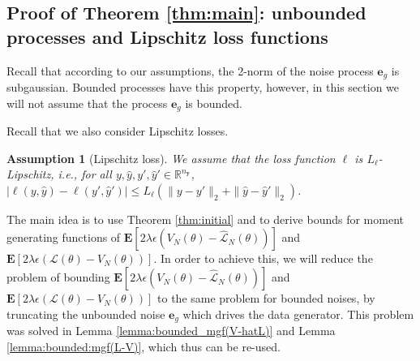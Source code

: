 \documentclass{article}
\def\rvy{{\mathbf{y}}}
\newtheorem{assumption}[theorem]{Assumption}
\newcommand{\e}{\mathbf{e}}
\newcommand{\bE}{\mathbf{E}}
\begin{document}
\subsection{Proof of Theorem \ref{thm:main}: unbounded processes and Lipschitz loss functions}
\label{lipschitz:unbounded}

 
Recall that according to our assumptions, the 2-norm of the noise process $\e_g$ is subgaussian. 
Bounded processes have this property, however, in this section we will not
assume that the process $\e_g$ is bounded. 

Recall that we also consider Lipschitz losses.
\begin{assumption}[Lipschitz loss]
  \label{as:unbounded_lipschitz}
We assume that the loss function $\ell$ is $L_{\ell}$-Lipschitz, i.e., 
for all $y,\hat{y},y',\hat{y}' \in \mathbb{R}^{n_\rvy}$,
$|\ell(y,\hat{y})-\ell(y',\hat{y}')| \le L_{\ell} (\|y-y'\|_2+\|\hat{y}-\hat{y}'\|_2)$.
\end{assumption}


The main idea is to use Theorem \ref{thm:initial} and to derive bounds for 
moment generating functions of 
$\bE[ 2\lambda \epsilon (V_N(\theta)-\hat{\mathcal{L}}_N(\theta))]$ and $\bE[2\lambda \epsilon (\mathcal{L}(\theta)-V_N(\theta))]$. 
In order to achieve this, we will reduce the problem of bounding 
$\bE[ 2\lambda \epsilon (V_N(\theta)-\hat{\mathcal{L}}_N(\theta))]$ and $\bE[2\lambda \epsilon (\mathcal{L}(\theta)-V_N(\theta))]$
to the same problem for bounded noises, %
by truncating the unbounded noise
$\e_g$  which drives the data generator. %
This problem was solved in Lemma \ref{lemma:bounded_mgf(V-hatL)} and Lemma \ref{lemma:bounded:mgf(L-V)}, which thus can be re-used. 
\end{document}
